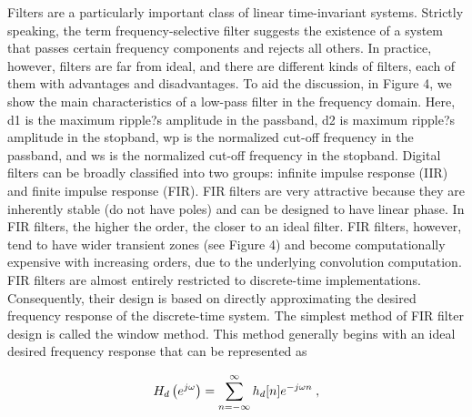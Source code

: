 \documentclass{article}
\begin{document}
Filters are a particularly important class of linear time-invariant systems. Strictly speaking, the term frequency-selective filter suggests the existence of a system that passes certain frequency components and rejects all others. In practice, however, filters are far from ideal, and there are different kinds of filters, each of them with advantages and disadvantages. To aid the discussion, in Figure 4, we show the main characteristics of a low-pass filter in the frequency domain. Here, d1 is the maximum ripple?s amplitude in the passband, d2 is maximum ripple?s amplitude in the stopband, wp is the normalized cut-off frequency in the passband, and ws is the normalized cut-off frequency in the stopband. Digital filters can be broadly classified into two groups: infinite impulse response (IIR) and finite impulse response (FIR). FIR filters are very attractive because they are inherently stable (do not have poles) and can be designed to have linear phase. In FIR filters, the higher the order, the closer to an ideal filter. FIR filters, however, tend to have wider transient zones (see Figure 4) and become computationally expensive with increasing orders, due to the underlying convolution computation. FIR filters are almost entirely restricted to discrete-time implementations. Consequently, their design is based on directly approximating the desired frequency response of the discrete-time system. The simplest method of FIR filter design is called the window method. This method generally begins with an ideal desired frequency response that can be represented as

% 
\begin{equation}
    \label{eq:filter}
    H_d \left( e^{j \omega} \right) = \sum_{n = -\infty}^{\infty} h_d[n] e^{-j \omega n}
    \hspace{0.25em},
\end{equation}
% 
\end{document}
